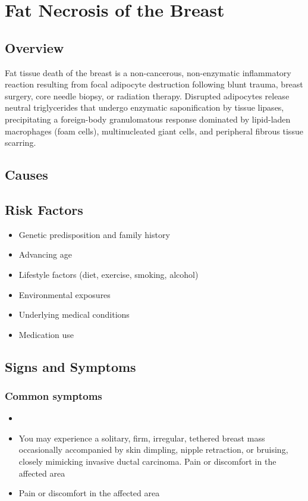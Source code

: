 \chapter{Fat Necrosis of the Breast}
\label{sec:Fat Necrosis of the Breast}

\section{Overview}
Fat tissue death of the breast is a non-cancerous, non-enzymatic inflammatory reaction resulting from focal adipocyte destruction following blunt trauma, breast surgery, core needle biopsy, or radiation therapy. Disrupted adipocytes release neutral triglycerides that undergo enzymatic saponification by tissue lipases, precipitating a foreign-body granulomatous response dominated by lipid-laden macrophages (foam cells), multinucleated giant cells, and peripheral fibrous tissue scarring.
\section{Causes}
\section{Risk Factors}

\begin{itemize}[noitemsep]
  \item Genetic predisposition and family history
  \item Advancing age
  \item Lifestyle factors (diet, exercise, smoking, alcohol)
  \item Environmental exposures
  \item Underlying medical conditions
  \item Medication use
\end{itemize}
\section{Signs and Symptoms}

\subsection{Common symptoms}
\begin{itemize}[noitemsep]
  \item \item You may experience a solitary, firm, irregular, tethered breast mass occasionally accompanied by skin dimpling, nipple retraction, or bruising, closely mimicking invasive ductal carcinoma. Pain or discomfort in the affected area    \item Pain or discomfort in the affected area
  \end{itemize}

